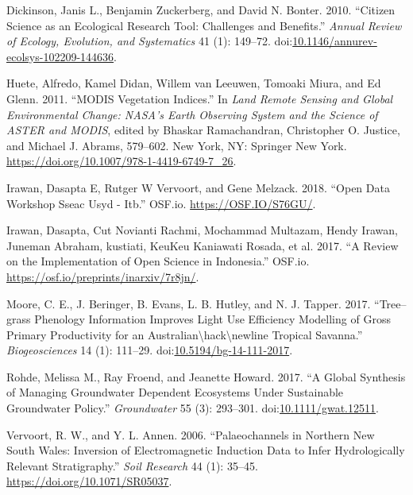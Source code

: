 \documentclass[]{elsarticle} %
\begin{document}
\hypertarget{refs}{}
\hypertarget{ref-dickinson_citizen_2010}{}
Dickinson, Janis L., Benjamin Zuckerberg, and David N. Bonter. 2010.
``Citizen Science as an Ecological Research Tool: Challenges and
Benefits.'' \emph{Annual Review of Ecology, Evolution, and Systematics}
41 (1): 149--72.
doi:\href{https://doi.org/10.1146/annurev-ecolsys-102209-144636}{10.1146/annurev-ecolsys-102209-144636}.

\hypertarget{ref-huete_modis_2011}{}
Huete, Alfredo, Kamel Didan, Willem van Leeuwen, Tomoaki Miura, and Ed
Glenn. 2011. ``MODIS Vegetation Indices.'' In \emph{Land Remote Sensing
and Global Environmental Change: NASA's Earth Observing System and the
Science of ASTER and MODIS}, edited by Bhaskar Ramachandran, Christopher
O. Justice, and Michael J. Abrams, 579--602. New York, NY: Springer New
York. \url{https://doi.org/10.1007/978-1-4419-6749-7_26}.

\hypertarget{ref-irawan_workshop_2018}{}
Irawan, Dasapta E, Rutger W Vervoort, and Gene Melzack. 2018. ``Open
Data Workshop Sseac Usyd - Itb.'' OSF.io. \url{https://OSF.IO/S76GU/}.

\hypertarget{ref-irawan_review_2017}{}
Irawan, Dasapta, Cut Novianti Rachmi, Mochammad Multazam, Hendy Irawan,
Juneman Abraham, kustiati, KeuKeu Kaniawati Rosada, et al. 2017. ``A
Review on the Implementation of Open Science in Indonesia.'' OSF.io.
\url{https://osf.io/preprints/inarxiv/7r8jn/}.

\hypertarget{ref-moore_treegrass_2017}{}
Moore, C. E., J. Beringer, B. Evans, L. B. Hutley, and N. J. Tapper.
2017. ``Tree--grass Phenology Information Improves Light Use Efficiency
Modelling of Gross Primary Productivity for an
Australian\textbackslash{}hack\textbackslash{}newline Tropical
Savanna.'' \emph{Biogeosciences} 14 (1): 111--29.
doi:\href{https://doi.org/10.5194/bg-14-111-2017}{10.5194/bg-14-111-2017}.

\hypertarget{ref-rohde_global_2017}{}
Rohde, Melissa M., Ray Froend, and Jeanette Howard. 2017. ``A Global
Synthesis of Managing Groundwater Dependent Ecosystems Under Sustainable
Groundwater Policy.'' \emph{Groundwater} 55 (3): 293--301.
doi:\href{https://doi.org/10.1111/gwat.12511}{10.1111/gwat.12511}.

\hypertarget{ref-vervoort_palaeochannels_2006}{}
Vervoort, R. W., and Y. L. Annen. 2006. ``Palaeochannels in Northern New
South Wales: Inversion of Electromagnetic Induction Data to Infer
Hydrologically Relevant Stratigraphy.'' \emph{Soil Research} 44 (1):
35--45. \url{https://doi.org/10.1071/SR05037}.
\end{document}
